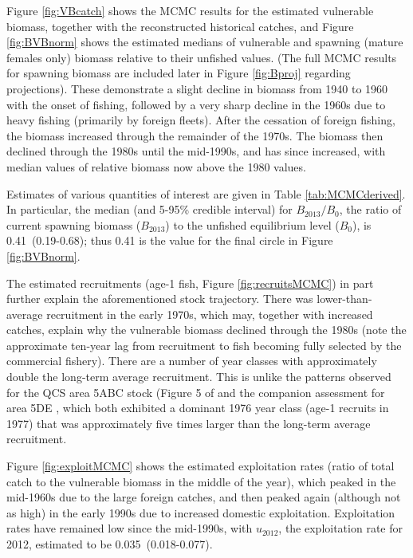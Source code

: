 \documentclass[11pt]{book}\usepackage[]{graphicx}\usepackage[]{color}
\begin{document}
Figure \ref{fig:VBcatch} shows the MCMC results for the estimated vulnerable biomass, together with the reconstructed historical catches, and Figure \ref{fig:BVBnorm} shows the estimated medians of vulnerable and spawning (mature females only) biomass relative to their unfished values. (The full MCMC results for spawning biomass are included later in Figure \ref{fig:Bproj} regarding projections). These demonstrate a slight decline in biomass from 1940 to 1960 with the onset of fishing, followed by a very sharp decline in the 1960s due to heavy fishing (primarily by foreign fleets). After the cessation of foreign fishing, the biomass increased through the remainder of the 1970s. The biomass then declined through the 1980s until the mid-1990s, and has since increased, with median values of relative biomass now above the 1980 values.

Estimates of various quantities of interest are given in Table \ref{tab:MCMCderived}. In particular, the median (and 5-95\% credible interval) for $B_{2013}/B_0$, the ratio of current spawning biomass ($B_{2013}$) to the unfished equilibrium level ($B_0$), is 0.41~(0.19-0.68); thus 0.41 is the value for the final circle in Figure \ref{fig:BVBnorm}.

The estimated recruitments (age-1 fish, Figure \ref{fig:recruitsMCMC}) in part further explain the aforementioned stock trajectory. There was lower-than-average recruitment in the early 1970s, which may, together with increased catches, explain why the vulnerable biomass declined through the 1980s (note the approximate ten-year lag from recruitment to fish becoming fully selected by the commercial fishery). There are a number of year classes with approximately double the long-term average recruitment. This is unlike the patterns observed for the QCS area 5ABC stock (Figure 5 of  and the companion assessment for area 5DE , which both exhibited a dominant 1976 year class (age-1 recruits in 1977) that was approximately five times larger than the long-term average recruitment.

Figure \ref{fig:exploitMCMC} shows the estimated exploitation rates (ratio of total catch to the vulnerable biomass in the middle of the year), which peaked in the mid-1960s due to the large foreign catches, and then peaked again (although not as high) in the early 1990s due to increased domestic exploitation. Exploitation rates have remained low since the mid-1990s, with $u_{2012}$, the exploitation rate for 2012, estimated to be 0.035~(0.018-0.077).
\end{document}

